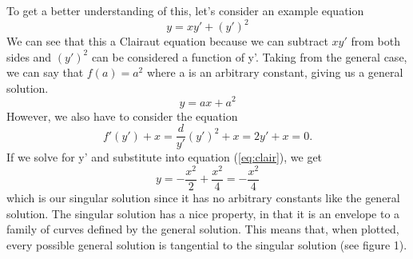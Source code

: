 \documentclass{article}
\newcommand{\be}{\begin{equation}}
\newcommand{\ee}{\end{equation}}
\begin{document}
To get a better understanding of this, let's consider an example equation
\be
y = x y' + (y')^2
\ee
We can see that this a Clairaut equation because we can subtract $xy'$ from both sides and $(y')^2$ can be considered a function of y'.
Taking from the general case, we can say that $f(a) = a^2$ where a is an arbitrary constant, giving us a general solution.
\be
y = ax + a^2
\ee
However, we also have to consider the equation
\be
f'(y') + x = \frac{d}{y'} (y')^2 + x = 2y' + x = 0.
\ee
If we solve for y' and substitute into equation (\ref{eq:clair}), we get
\be
y = -\frac{x^2}{2} + \frac{x^2}{4} = -\frac{x^2}{4}
\ee
which is our singular solution since it has no arbitrary constants like the general solution.
The singular solution has a nice property, in that it is an envelope to a family of curves defined by the general solution.
This means that, when plotted, every possible general solution is tangential to the singular solution (see figure 1).
\end{document}
